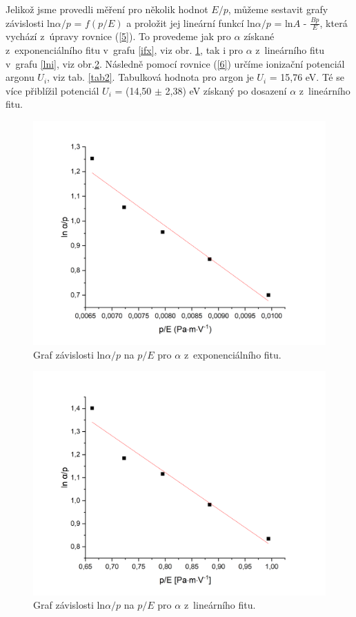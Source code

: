 \documentclass[a4paper,12pt]{article}
\begin{document}
\newpage
Jelikož jsme provedli měření pro několik hodnot $E/p$, můžeme sestavit grafy závislosti ln$\alpha/p$ = $f(p/E)$ a proložit jej lineární funkcí ln$\alpha/p$ = ln$A$ - $\frac{Bp}{E}$, která vychází z~úpravy rovnice (\ref{5}). To provedeme jak pro $\alpha$ získané z~exponenciálního fitu v~grafu \ref{ifx}, viz obr. \ref{exp}, tak i pro $\alpha$ z~lineárního fitu v~grafu \ref{lni}, viz obr.\ref{lin}. Následně pomocí rovnice (\ref{6}) určíme ionizační potenciál argonu $U_i$, viz tab. \ref{tab2}. Tabulková hodnota pro argon je $U_i$ = 15,76 eV. Té se více přiblížil potenciál $U_i$ = (14,50 $\pm$  2,38) eV získaný po dosazení $\alpha$ z~lineárního fitu.
 
 \begin{figure}[h]
 	\centering
 	\includegraphics[width=145mm]{exp.png}
 	\caption{Graf závislosti ln$\alpha/p$ na $p/E$ pro $\alpha$ z~exponenciálního fitu.}
 	\label{exp}
 \end{figure}

 \begin{figure}[h]
	\centering
	\includegraphics[width=145mm]{lin.png}
	\caption{Graf závislosti ln$\alpha/p$ na $p/E$ pro $\alpha$ z~lineárního fitu.}
	\label{lin}
\end{figure}
 
\end{document}

